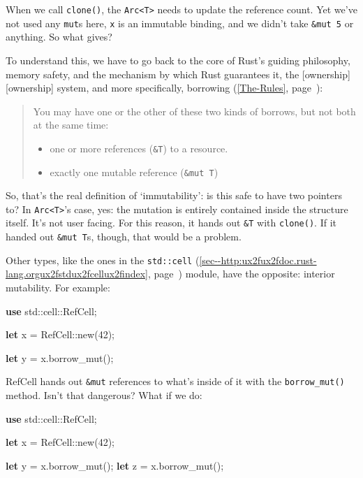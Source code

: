 \documentclass[a4paper,]{book}
\renewcommand*{\hyperref}[2][\ar]{%
  \def\ar{#2}%
  #2 (\autoref{#1}, page~\pageref{#1})}
\newenvironment{Shaded}{\begin{snugshade}}{\end{snugshade}}
\newcommand{\KeywordTok}[1]{\textcolor[rgb]{0.13,0.29,0.53}{\textbf{{#1}}}}
\newcommand{\DecValTok}[1]{\textcolor[rgb]{0.00,0.00,0.81}{{#1}}}
\newcommand{\NormalTok}[1]{{#1}}
\begin{document}
When we call \texttt{clone()}, the
\texttt{Arc\textless{}T\textgreater{}} needs to update the reference
count. Yet we've not used any \texttt{mut}s here, \texttt{x} is an
immutable binding, and we didn't take \texttt{\&mut\ 5} or anything. So
what gives?

To understand this, we have to go back to the core of Rust's guiding
philosophy, memory safety, and the mechanism by which Rust guarantees
it, the {[}ownership{]}{[}ownership{]} system, and more specifically,
\hyperref[The-Rules]{borrowing}:

\begin{quote}
You may have one or the other of these two kinds of borrows, but not
both at the same time:

\begin{itemize}
\itemsep1pt\parskip0pt
\item
  one or more references (\texttt{\&T}) to a resource.
\item
  exactly one mutable reference (\texttt{\&mut\ T})
\end{itemize}
\end{quote}

So, that's the real definition of `immutability': is this safe to have
two pointers to? In \texttt{Arc\textless{}T\textgreater{}}'s case, yes:
the mutation is entirely contained inside the structure itself. It's not
user facing. For this reason, it hands out \texttt{\&T} with
\texttt{clone()}. If it handed out \texttt{\&mut\ T}s, though, that
would be a problem.

Other types, like the ones in the
\hyperref[sec--http:ux2fux2fdoc.rust-lang.orgux2fstdux2fcellux2findex]{\texttt{std::cell}}
module, have the opposite: interior mutability. For example:

\begin{Shaded}
\begin{Highlighting}[]
\KeywordTok{use} \NormalTok{std::cell::RefCell;}

\KeywordTok{let} \NormalTok{x = RefCell::new(}\DecValTok{42}\NormalTok{);}

\KeywordTok{let} \NormalTok{y = x.borrow_mut();}
\end{Highlighting}
\end{Shaded}

RefCell hands out \texttt{\&mut} references to what's inside of it with
the \texttt{borrow\_mut()} method. Isn't that dangerous? What if we do:

\begin{Shaded}
\begin{Highlighting}[]
\KeywordTok{use} \NormalTok{std::cell::RefCell;}

\KeywordTok{let} \NormalTok{x = RefCell::new(}\DecValTok{42}\NormalTok{);}

\KeywordTok{let} \NormalTok{y = x.borrow_mut();}
\KeywordTok{let} \NormalTok{z = x.borrow_mut();}
\end{Highlighting}
\end{Shaded}
\end{document}

